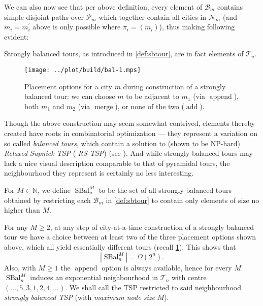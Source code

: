 \documentclass[index=totoc,bibliography=totoc]{scrartcl}
\numberwithin{equation}{section}
\numberwithin{figure}{section}
\numberwithin{table}{section}
\let\defstyle\itshape
\begin{document}
We can also now see that per above definition, every element of
$\mathcal{B}_m$ contains simple disjoint paths over $\mathcal{P}_m$ which
together contain all cities in $\mathcal{N}_m$ (and $m_i = m_i^\prime$ above is
only possible where $\pi_i = (m_i)$), thus making following evident:
\begin{remark}
  Strongly balanced tours, as introduced in \cref{def:sbtour},
  are in fact elements of $\mathcal{T}_n$.
\end{remark}

\begin{figure}[hbt]
  \centering
  \texttt{[image: ../plot/build/bal-1.mps]}
  \caption{%
    Placement options for a city $m$ during construction of a strongly
    balanced tour: we can choose $m$ to be adjacent to $m_1$ (via $\operatorname{append}$),
    both $m_1$ and $m_2$ (via $\operatorname{merge}$), or none of the two ($\operatorname{add}$).
 }
 \label{fig:sbopt}
\end{figure}

Though the above construction may seem somewhat contrived, elements thereby
created have roots in combinatorial optimization --- they represent a
variation on so called {\defstyle balanced tours}, which contain a solution
to (shown to be NP-hard) {\defstyle Relaxed Supnick TSP} ({\defstyle
  RS-TSP}) (see \cite{fpclass,fpneighb}).
And while strongly balanced tours may lack a nice visual description
comparable to that of pyramidal tours, the neighbourhood they represent is
certainly no less interesting.

\begin{define}
For $M \in \mathbb{N}$, we define $\operatorname{SBal}_n^M$ to be the set of all
strongly balanced tours obtained by restricting each $\mathcal{B}_m$ in \cref{def:sbtour}
to contain only elements of size no higher than $M$.
\end{define}

\begin{remark}
  For any $M \geq 2$, at any step of city-at-a-time construction of a
  strongly balanced tour we have a choice between at least two of the three
  placement options shown above, %
  which all yield essentially different tours (recall \cref{fig:sbopt}).  This shows that
  \[
    \left|\operatorname{SBal}_n^M\right| = \Omega\left(2^n\right).
  \]
  Also, with $M \geq 1$ the $\operatorname{append}$ option is always available,
  hence for every $M$ $\operatorname{SBal}_n^M$ induces an exponential neighbourhood
  in $\mathcal{T}_n$ with centre $\left(\ldots,5,3,1,2,4,\ldots\right)$.
  We shall call the TSP restricted to said neighbourhood
  {\defstyle strongly balanced TSP} (with {\defstyle maximum node size} $M$).
\end{remark}
\end{document}
